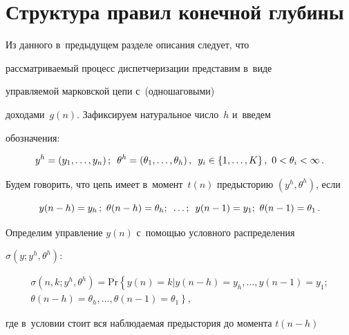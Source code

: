   


\section{Структура правил конечной глубины}





  Из данного в~предыдущем разделе описания следует, что 


рас\-смат\-ри\-ва\-емый процесс диспетчеризации представим в~виде 


управляемой марковской цепи   с~(одношаговыми) 


доходами~$g(n)$. Зафиксируем натуральное число~$h$ и~введем 


обозначения:


  $$


  y^h=\left( y_1, \ldots , y_n\right);\enskip \theta^h=\left(\theta_1, \ldots , 


\theta_h\right),\enskip y_i \in \{1,\ldots , K\}\,,\ 0< \theta_i<\infty\,.


  $$


  


  Будем говорить, что цепь имеет в~момент~$t(n)$ предысторию $(y^h, 


\theta^h)$, если


  $$


  y(n-h) =y_h\,;\  \theta(n-h)=\theta_h;\enskip\ldots ;\enskip y(n-1)=y_1;\ \theta(n-


1)=\theta_1\,.


  $$


  


  Определим управление $y(n)$ с~по\-мощью условного распределения 


$\sigma(y; y^h,\theta^h)$:


  \begin{multline*}


  \sigma(n,k; y^h,\theta^h)=\mathrm{Pr}\left\{ y(n)=k\vert y(n-h)=y_h,\ldots, 


y(n-1)=y_1;


\right.\\


  \left.{}\theta(n-h)=\theta_h,\ldots , \theta(n-1)=\theta_1\right\},


  \end{multline*}


где в~условии стоит вся наблюдаемая предыстория до момента $t(n-h)$\linebreak 


